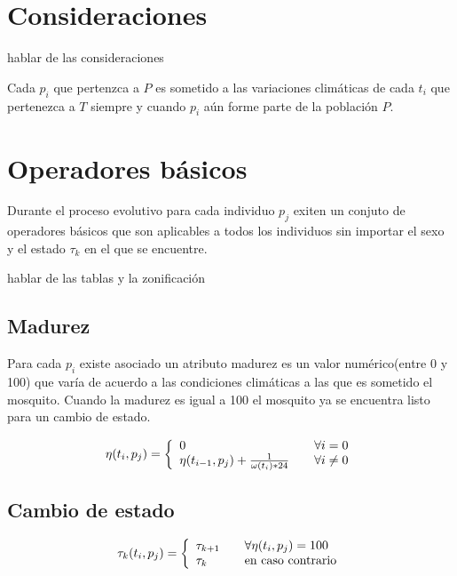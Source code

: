 \section{Consideraciones}
hablar de las consideraciones

Cada $p_{i}$ que pertenzca a $P$ es sometido a las variaciones climáticas de
cada $t_{i}$ que pertenezca a $T$ siempre y cuando $p_{i}$ aún forme parte
de la población $P$.

\section{Operadores básicos}
Durante el proceso evolutivo para cada individuo $p_{j}$ exiten un conjuto
de operadores básicos que son aplicables a todos los individuos sin importar
el sexo y el estado $\tau_{k}$ en el que se encuentre.

hablar de las tablas y la zonificación


\subsection{Madurez}
Para cada $p_{i}$ existe asociado un atributo madurez  es
un valor numérico(entre 0 y 100) que varía de acuerdo a las condiciones
climáticas a las que es sometido el mosquito. Cuando la madurez es igual
a 100 el mosquito ya se encuentra listo para un cambio de estado.

\begin{equation}
\eta (t_{i}, p_{j}) = \left\{
  \begin{array}{l l}
    0 & \quad \forall i = 0 \\
    \eta (t_{i-1}, p_{j}) + \frac{1}{\omega(t_{i}) * 24} & \quad \forall i \neq 0
  \end{array} \right.
\end{equation}

\subsection{Cambio de estado}

\begin{equation}
\tau_{k} (t_{i}, p_{j}) = \left\{
  \begin{array}{l l}
    \tau_{k+1} & \quad \forall  \eta(t_{i}, p_{j}) = 100 \\
    \tau_{k} & \quad \text{en caso contrario}
  \end{array} \right.
\end{equation}


